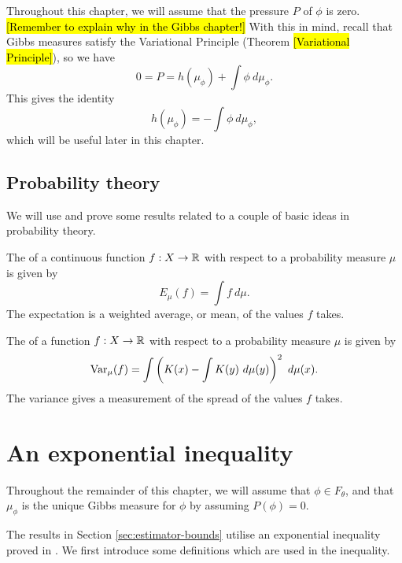 Throughout this chapter, we will assume that the pressure $P$ of $\phi$ is zero. \hl{[Remember to explain why in the Gibbs chapter!]} With this in mind, recall that
Gibbs measures satisfy the Variational Principle (Theorem \hl{[Variational Principle]}), so we have
\[
	0 = P = h(\mu_\phi) + \int{\phi\ d\mu_\phi}.
\]
This gives the identity
\begin{equation}\label{fml:vp-identity}
	h(\mu_\phi) = -\int{\phi\ d\mu_\phi},
\end{equation}
which will be useful later in this chapter.

\subsection{Probability theory}
We will use and prove some results related to a couple of basic ideas in probability theory.
\begin{definition}
	The  of a continuous function $f : X \to \mathbb{R}$ with respect to a probability measure $\mu$ is given by
	\[
		E_\mu(f) = \int{f\ d\mu}.
	\]
	The expectation is a weighted average, or mean, of the values $f$ takes.~\cite[p127]{gray:probability}
\end{definition}

\begin{definition}
	The  of a function $f : X \to \mathbb{R}$ with respect to a probability measure $\mu$ is given by
	\[
		\operatorname{Var}_{\mu}(f) = \int{\left(K(x) - \int{K(y)\ d\mu(y)}\right)^2\ d\mu(x)}.
	\]
	The variance gives a measurement of the spread of the values $f$ takes.
\end{definition}

\section{An exponential inequality}
Throughout the remainder of this chapter, we will assume that $\phi \in F_\theta$, and that $\mu_\phi$ is the unique Gibbs measure for $\phi$ by assuming $P(\phi) = 0$.

The results in Section \ref{sec:estimator-bounds} utilise an exponential inequality proved in \cite{collet-martinez-schmitt:exp-ineq}. We first introduce some definitions which are used in the inequality.

